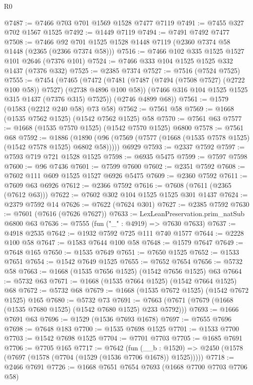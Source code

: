 \begin{lexlean}{R0}
\begin{coremodule}
@7487 := @7466 @703 @701 @1569 @1528 @7477 @7119
@7491 := @7455 @327 @702 @1567 @1525
@7492 := @1449 @7119
@7494 := @7491 @7492 @7477
@7508 := @7466 @92 @701 @1525 @1528 @1448 @7119 (@2360 @7374 @58 @1448 (@2365 (@2366 @7374 @58)))
@7516 := @7466 @102 @335 @1525 @1527 @101 @2646 (@7376 @101)
@7524 := @7466 @333 @104 @1525 @1525 @332 @1437 (@7376 @332)
@7525 := @2385 @7374
@7527 := @7516 (@7524 @7525)
@7555 := @7454
    (@7465
      (@7472
        (@7481 (@7487 (@7494 (@7508 @7527) (@2722 @100 @58)) @7527) (@2738 @4896 @100 @58))
        (@7466 @316 @104 @1525 @1525 @315 @1437 (@7376 @315) @7525))
      (@2746 @4899 @68))
@7561 := @1579 (@1583 (@2212 @240 @58) @73 @58)
@7562 := @7561 @58
@7569 := @1668 (@1535 @7562 @1525) (@1542 @7562 @1525) @58
@7570 := @7561 @63
@7577 := @1668 (@1535 @7570 @1525) (@1542 @7570 @1525) @6800
@7578 := @7561 @68
@7592 := @1886
    (@1890 (@96 (@7569 (@7577 (@1668 (@1535 @7578 @1525) (@1542 @7578 @1525) @6802 @58)))))
    @6929
@7593 := @2337 @7592
@7597 := @7593 @719 @721 @1528 @1525
@7598 := @6935 @5475
@7599 := @7597 @7598
@7600 := @96 @7436
@7601 := @7599 @7600
@7602 := @2351 @7592
@7608 := @7602 @111 @609 @1525 @1527 @6926 @5475
@7609 := @2360 @7592
@7611 := @7609 @63 @6926
@7612 := @2366 @7592
@7616 := @7608 (@7611 (@2365 (@7612 @63)))
@7622 := @7602 @302 @104 @1525 @1525 @301 @1437
@7624 := @2379 @7592 @14
@7626 := @7622 (@7624 @301)
@7627 := @2385 @7592
@7630 := @7601 (@7616 (@7626 @7627))
@7633 := LexLeanPreservation.prim_natSub @6800 @63
@7636 := @7555 (fun ("_" : @4919) => @7630 @7633)
@7637 := @4918 @2535
@7642 := @1932 @7592 @725 @111 @740 @1577
@7644 := @2228 @100 @58
@7647 := @1583 @7644 @100 @58
@7648 := @1579 @7647
@7649 := @7648 @165
@7650 := @1535 @7649
@7651 := @7650 @1525
@7652 := @1533 @7651
@7654 := @1542 @7649 @1525
@7655 := @7652 @7654
@7656 := @5732 @58
@7663 := @1668 (@1535 @7656 @1525) (@1542 @7656 @1525) @63
@7664 := @5732 @63
@7671 := @1668 (@1535 @7664 @1525) (@1542 @7664 @1525) @68
@7672 := @5732 @68
@7679 := @1668 (@1535 @7672 @1525) (@1542 @7672 @1525) @165
@7680 := @5732 @73
@7691 := @7663 (@7671 (@7679 (@1668 (@1535 @7680 @1525) (@1542 @7680 @1525) @233 @5792)))
@7693 := @1666 @7691 @63
@7696 := @1529 (@1536 @7693 @1678)
@7697 := @7655 @7696
@7698 := @7648 @183
@7700 := @1535 @7698 @1525
@7701 := @1533 @7700
@7703 := @1542 @7698 @1525
@7704 := @7701 @7703
@7705 := @1685 @7691
@7706 := @7705 @165
@7717 := @7642
    (fun (__b : @1520) => @2450 (@1578 (@7697 (@1578 (@7704 (@1529 (@1536 @7706 @1678)) @1525)))))
@7718 := @2466 @7691
@7726 := @1668 @7651 @7654 @7693 (@1668 @7700 @7703 @7706 @58)

\end{coremodule}
\end{lexlean}
